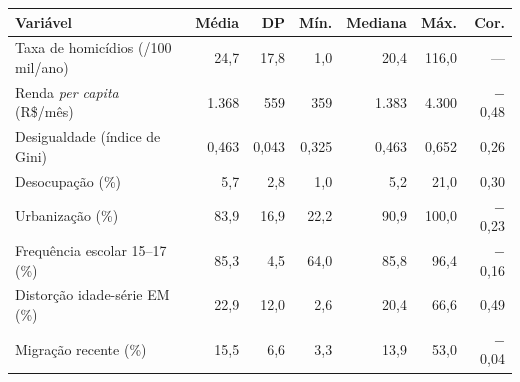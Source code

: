\begin{tabular}{@{}lrrrrrr@{}}
\toprule
\textbf{Variável} & \textbf{Média} & \textbf{DP} & \textbf{Mín.} & \textbf{Mediana} & \textbf{Máx.} & \textbf{Cor.}\\
\midrule
Taxa de homicídios (/100 mil/ano) & 24,7 & 17,8 & 1,0 & 20,4 & 116,0 & ---\\
Renda \textit{per capita} (R\$/mês) & 1.368 & 559 & 359 & 1.383 & 4.300 & $-$0,48\\
Desigualdade (índice de Gini) & 0,463 & 0,043 & 0,325 & 0,463 & 0,652 & 0,26\\
Desocupação (\%) & 5,7 & 2,8 & 1,0 & 5,2 & 21,0 & 0,30\\
Urbanização (\%) & 83,9 & 16,9 & 22,2 & 90,9 & 100,0 & $-$0,23\\
Frequência escolar 15--17 (\%) & 85,3 & 4,5 & 64,0 & 85,8 & 96,4 & $-$0,16\\
Distorção idade-série EM (\%) & 22,9 & 12,0 & 2,6 & 20,4 & 66,6 & 0,49\\
Migração recente (\%) & 15,5 & 6,6 & 3,3 & 13,9 & 53,0 & $-$0,04\\
\bottomrule
\end{tabular}
